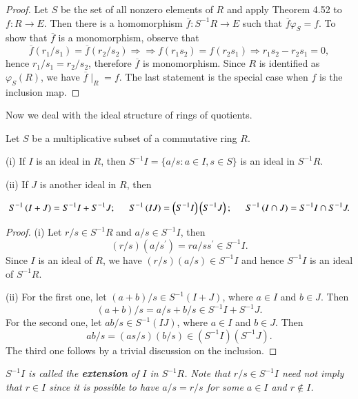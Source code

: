 \begin{proof}
Let $S$ be the set of all nonzero elements of $R$ and apply Theorem 4.52 to $f:R\to E$. Then there is a homomorphism $\overline{f}:S^{-1}R\to E$ such that $\overline{f}\varphi_S=f$. To show that $\overline{f}$ is a monomorphism, observe that 
$$
\overline{f}\left( r_1/s_1 \right) =\overline{f}\left( r_2/s_2 \right) \Rightarrow \Rightarrow f\left( r_1s_2 \right) =f\left( r_2s_1 \right) \Rightarrow r_1s_2-r_2s_1=0,
$$
hence $r_1/s_1=r_2/s_2$, therefore $\overline{f}$ is monomorphism. Since $R$ is identified as $\varphi_S(R)$, we have $\overline{f}\mid_R=f$. The last statement is the special case when $f$ is the inclusion map.
\end{proof}
Now we deal with the ideal structure of rings of quotients.
\begin{theorem}
Let $S$ be a multiplicative subset of a commutative ring $R$.\par
(i) If $I$ is an ideal in $R$, then $S^{-1}I=\{a/s:a\in I,s\in S\}$ is an ideal in $S^{-1}R$.\par
(ii) If $J$ is another ideal in $R$, then 
\begin{small}
$$
S^{-1}\left( I+J \right) =S^{-1}I+S^{-1}J;\hspace{0.5cm}S^{-1}\left( IJ \right) =\left( S^{-1}I \right) \left( S^{-1}J \right) ;\hspace{0.5cm}S^{-1}\left( I\cap J \right) =S^{-1}I\cap S^{-1}J.
$$
\end{small}
\end{theorem}
\begin{proof}
(i) Let $r/s\in S^{-1}R$ and $a/s\in S^{-1}I$, then 
$$
\left( r/s \right) \left( a/s^{\prime} \right) =ra/ss^{\prime}\in S^{-1}I.
$$
Since $I$ is an ideal of $R$, we have $(r/s)(a/s)\in S^{-1}I$ and hence $S^{-1}I$ is an ideal of $S^{-1}R$.\par
(ii) For the first one, let $(a+b)/s\in S^{-1}(I+J)$, where $a\in I$ and $b\in J$. Then 
$$
\left( a+b \right) /s=a/s+b/s\in S^{-1}I+S^{-1}J.
$$
For the second one, let $ab/s\in S^{-1}(IJ)$, where $a\in I$ and $b\in J$. Then 
$$
ab/s=\left( as/s \right) \left( b/s \right) \in \left( S^{-1}I \right) \left( S^{-1}J \right) .
$$
The third one follows by a trivial discussion on the inclusion.
\end{proof}
\begin{note}\em
$S^{-1}I$ is called the \textbf{extension} of $I$ in $S^{-1}R$. Note that $r/s\in S^{-1}I$ need not imply that $r\in I$ since it is possible to have $a/s=r/s$ for some $a\in I$ and $r\notin I$.
\end{note}
